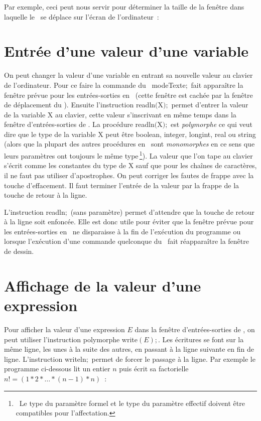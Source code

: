 Par exemple, ceci peut nous servir pour déterminer la taille de la fenêtre dans laquelle le \robot\ 
se déplace sur l'écran de l'ordinateur~:


\section{Entrée d'une valeur d'une variable}
On peut changer la valeur d'une variable en entrant sa nouvelle valeur au clavier de 
l'ordinateur. Pour
ce faire la commande du \robot\ {\idt modeTexte$;$} fait apparaître la fenêtre prévue pour les
entrées-sorties en \pascal\ (cette fenêtre est cachée par la fenêtre 
de déplacement du \robot). Ensuite 
l'instruction {\idt readln$($X$);$} permet d'entrer la valeur de la variable {\idt X} au 
clavier, cette valeur s'inscrivant en même temps dans la fenêtre d'entrées-sorties de \pascal.
La procédure {\idt readln$($X$);$} est {\em polymorphe}\index{Polymorphe} ce qui veut dire que le type de la va\-ria\-ble {\idt X} peut
être {\idt boolean}, {\idt integer}, {\idt longint}, {\idt real} ou {\idt string} (alors que
la plupart des autres procédures en \pascal\ sont {\em monomorphes}\index{Monomorphe} en ce sens que leurs paramètres
ont toujours le même type\,\footnote{\ Le type du paramètre formel et le type du
paramètre effectif doivent être compatibles pour l'affectation.}). La valeur que l'on tape au clavier s'écrit comme les constantes du type
de {\idt X} sauf que pour les chaînes de caractères, il ne faut pas utiliser 
 d'apostrophes. On peut 
corriger les fautes de frappe avec la touche  %
\framebox[11.mm][l]{$\leftarrow$~~~}\hspace{0.3ex} 
d'effacement. Il faut terminer l'entrée de la valeur par la frappe de la touche %
\framebox[11.mm][l]{$\hookleftarrow$~~~}\hspace{0.3ex}
de retour à la ligne.

L'instruction {\idt readln$;$} (sans paramètre) permet d'attendre que la touche %
\framebox[11.mm][l]{$\hookleftarrow$~~~}\hspace{0.3ex}
de retour à la ligne soit enfoncée. Elle est donc utile pour éviter que la fenêtre prévue pour les
entrées-sorties en \pascal\ ne disparaisse à la fin de l'exécution du programme ou lorsque
l'exécution d'une commande quelconque du \robot\ fait réapparaître 
la fenêtre de dessin. 

\section{Affichage de la valeur d'une expression}
Pour afficher la valeur d'une expression $E$ dans la fenêtre d'entrées-sorties de \pascal, on
peut utiliser l'instruction polymorphe {\idt write$(E);$}. Les écritures se font sur la même ligne, les unes 
à la suite des autres, en passant à la ligne suivante en fin de ligne. L'instruction
{\idt writeln$;$} permet de forcer le passage à la ligne. Par exemple 
le programme ci-dessous lit
un entier $n$ 
puis écrit sa factorielle $n! = (1 \ast 2 \ast \ldots \ast (n - 1) \ast n)$~:


